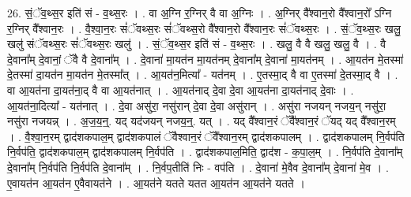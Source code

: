 \documentclass[17pt]{extarticle}
\begin{document}
26. सं॒ॅव॒थ्स॒र इति॑ सं - व॒थ्स॒रः । . वा अ॒ग्नि र॒ग्निर् वै वा अ॒ग्निः । . अ॒ग्निर् वै᳚श्वान॒रो वै᳚श्वान॒रो᳚ ऽग्नि र॒ग्निर् वै᳚श्वान॒रः । . वै॒श्वा॒न॒रः सं॑ॅवथ्स॒रः सं॑ॅवथ्स॒रो वै᳚श्वान॒रो वै᳚श्वान॒रः सं॑ॅवथ्स॒रः । . सं॒ॅव॒थ्स॒रः खलु॒ खलु॑ संॅवथ्स॒रः सं॑ॅवथ्स॒रः खलु॑ । . सं॒ॅव॒थ्स॒र इति॑ सं - व॒थ्स॒रः । . खलु॒ वै वै खलु॒ खलु॒ वै । . वै दे॒वाना᳚म् दे॒वानां॒ ॅवै वै दे॒वाना᳚म् । . दे॒वाना॑ मा॒यत॑न मा॒यत॑नम् दे॒वाना᳚म् दे॒वाना॑ मा॒यत॑नम् । . आ॒यत॑न मे॒तस्मा॑ दे॒तस्मा॑ दा॒यत॑न मा॒यत॑न मे॒तस्मा᳚त् । . आ॒यत॑न॒मित्या᳚ - यत॑नम् । . ए॒तस्मा॒द् वै वा ए॒तस्मा॑ दे॒तस्मा॒द् वै । . वा आ॒यत॑ना दा॒यत॑ना॒द् वै वा आ॒यत॑नात् । . आ॒यत॑नाद् दे॒वा दे॒वा आ॒यत॑ना दा॒यत॑नाद् दे॒वाः । . आ॒यत॑ना॒दित्या᳚ - यत॑नात् । . दे॒वा असु॑रा॒ नसु॑रान् दे॒वा दे॒वा असु॑रान् । . असु॑रा नजयन् नजय॒न् नसु॑रा॒ नसु॑रा नजयन्न् । . अ॒ज॒य॒न्॒. यद् यद॑जयन् नजय॒न्॒. यत् । . यद् वै᳚श्वान॒रं ॅवै᳚श्वान॒रं ॅयद् यद् वै᳚श्वान॒रम् । . वै॒श्वा॒न॒रम् द्वाद॑शकपाल॒म् द्वाद॑शकपालं ॅवैश्वान॒रं ॅवै᳚श्वान॒रम् द्वाद॑शकपालम् । . द्वाद॑शकपालम् नि॒र्वप॑ति नि॒र्वप॑ति॒ द्वाद॑शकपाल॒म् द्वाद॑शकपालम् नि॒र्वप॑ति । . द्वाद॑शकपाल॒मिति॒ द्वाद॑श - क॒पा॒ल॒म् । . नि॒र्वप॑ति दे॒वाना᳚म् दे॒वाना᳚म् नि॒र्वप॑ति नि॒र्वप॑ति दे॒वाना᳚म् । . नि॒र्वप॒तीति॑ निः - वप॑ति । . दे॒वाना॑ मे॒वैव दे॒वाना᳚म् दे॒वाना॑ मे॒व । . ए॒वायत॑न आ॒यत॑न ए॒वैवायत॑ने । . आ॒यत॑ने यतते यतत आ॒यत॑न आ॒यत॑ने यतते । \newline
\end{document}
